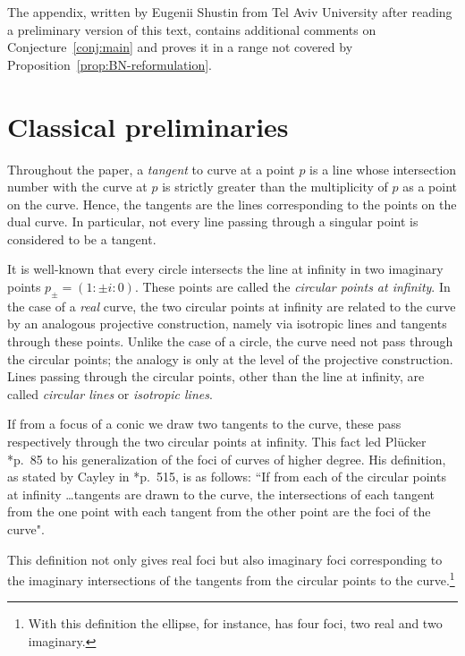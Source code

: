 \documentclass[11pt]{amsart}
\theoremstyle{definition}
\theoremstyle{remark}
\begin{document}
The appendix, written by Eugenii Shustin from Tel Aviv University after reading a preliminary version of this text, contains additional comments on Conjecture~\ref{conj:main} and proves it in a range not covered by Proposition~\ref{prop:BN-reformulation}.

\section{Classical preliminaries}

Throughout the paper,  a \emph{tangent} to curve at a point $p$ is a line whose intersection number with the curve at $p$ is strictly greater than the multiplicity of $p$ as a point on the curve. Hence, the tangents are the lines corresponding to the points on the dual curve.
In particular, not every line passing through a singular point is considered to be a  tangent. 

It is well-known that every circle intersects the line at infinity in two imaginary points $p_\pm=(1:\pm i:0)$. These points are called the \emph{circular points at infinity}.  %
In the case of a \emph{real} curve, the two circular points at infinity are related to the curve by an analogous projective construction, namely via isotropic lines and tangents through these points.  Unlike the case of a circle, the curve need not pass through the circular points; the analogy is only at the level of the projective construction. Lines passing through the circular points, other than the line at infinity, are called \emph{circular lines} or \emph{isotropic lines}. 

If from a focus of a conic we draw two tangents to the curve, these pass respectively through the two circular points at infinity. This fact led Pl\"ucker \cite {Pl}*{p.~85} to his generalization of the foci of curves of higher degree. His definition, as stated by Cayley in \cite {Cay}*{p.~515}, is as follows: ``If from each of the circular points at infinity \ldots tangents are drawn to the curve, the intersections of each tangent from the one point with each tangent from the other point are the foci of the curve".

This definition not only gives real foci but also imaginary foci corresponding to the imaginary intersections of the tangents from the circular points to the curve.\footnote{With this definition the ellipse, for instance, has four foci, two real and two imaginary.}
\end{document}

